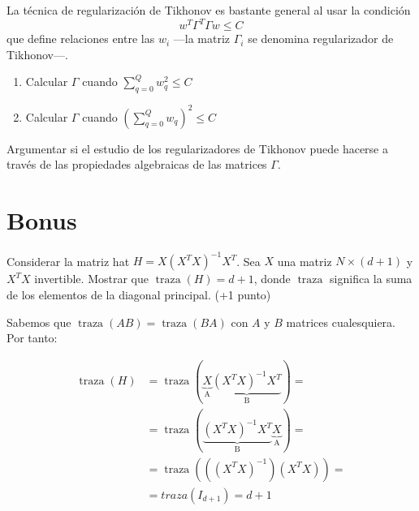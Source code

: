 \documentclass[a4paper, 11pt]{article}
\begin{document}
      \begin{ejercicio}
        La técnica de regularización de Tikhonov es bastante general al usar la condición
        \[
        w^T\Gamma^T\Gamma w \leq C
        \]
        que define relaciones entre las $w_i$ ---la matriz $\Gamma_i$ se denomina regularizador de Tikhonov---.
        \begin{enumerate}
        \item Calcular $\Gamma$ cuando $\sum_{q=0}^Q w_q^2 \leq C$
        \item Calcular $\Gamma$ cuando $(\sum_{q=0}^Q w_q)^2 \leq C$
        \end{enumerate}
        Argumentar si el estudio de los regularizadores de Tikhonov puede hacerse a través de las propiedades algebraicas de las matrices $\Gamma$.
      \end{ejercicio}


    \section{Bonus}

    \begin{bonus}
      Considerar la matriz hat $H = X(X^TX)^{-1}X^T$. Sea $X$ una matriz  $N \times (d+1)$ y $X^TX$ invertible. Mostrar que $\operatorname{traza}(H)=d+1$, donde $\operatorname{traza}$ significa la suma de los elementos de la diagonal principal. (+1 punto)
    \end{bonus}

    \begin{solucion}
        Sabemos que $\operatorname{traza}(AB) = \operatorname{traza}(BA)$ con $A$ y $B$ matrices cualesquiera. Por tanto:

        \begin{align*}
            \operatorname{traza}(H) &= \operatorname{traza}(\underbrace{X}_\textrm{A}\underbrace{(X^TX)^{-1}X^T}_\textrm{B}) = \\
            &= \operatorname{traza}(\underbrace{(X^TX)^{-1}X^T}_\textrm{B}\underbrace{X}_\textrm{A}) = \\
            &= \operatorname{traza}\left(\left((X^TX)^{-1}\right)\left(X^TX\right)\right) = \\ &= traza(I_{d+1}) = d+1
        \end{align*}
    \end{solucion}
\end{document}
